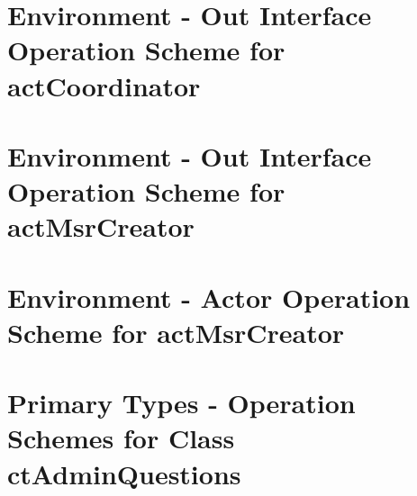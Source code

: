 \section{Environment - Out Interface Operation Scheme for actCoordinator}
\label{OM-EM-OutInterface-OS-actCoordinator}









\section{Environment - Out Interface Operation Scheme for actMsrCreator}
\label{OM-EM-OutInterface-OS-actMsrCreator}



		
\section{Environment - Actor Operation Scheme for actMsrCreator}
\label{OM-EM-actMsrCreator}
 



\section{Primary Types - Operation Schemes for Class ctAdminQuestions} 
\label{OM-CM-PTClass-ctAdminQuestions}


